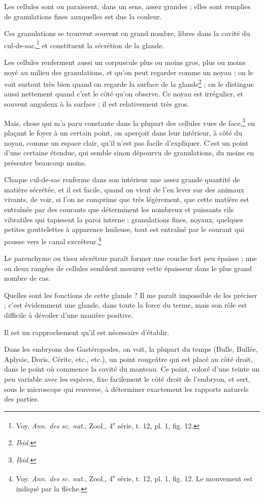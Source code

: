\documentclass[a4paper, 11pt, oneside, polutonikogreek, french]{article}
\begin{document}
Les cellules sont ou paraissent, dans un sens, assez grandes ; elles sont remplies de granulations fines auxquelles est due la couleur.

Ces granulations se trouvent souvent en grand nombre, libres dans la cavité du cul-de-sac,\footnote{Voy. \emph{Ann. des sc. nat.}, Zool., 4\textsuperscript{e} série, t. 12, pl. 1, fig. 12.} et constituent la sécrétion de la glande.

Les cellules renferment aussi un corpuscule plus ou moins gros, plus ou moins noyé au milieu des granulations, et qu'on peut regarder comme un noyau ; on le voit surtout très bien quand on regarde la surface de la glande\footnote{\emph{Ibid.}} ; on le distingue aussi nettement quand c'est le côté qu'on observe. Ce noyau est irrégulier, et souvent anguleux à la surface ; il est relativement très gros.

Mais, chose qui m'a paru constante dans la plupart des cellules vues de face,\footnote{\emph{Ibid.}} en plaçant le foyer à un certain point, on aperçoit dans leur intérieur, à côté du noyau, comme un espace clair, qu'il n'est pas facile d'expliquer. C'est un point d'une certaine étendue, qui semble sinon dépourvu de granulations, du moins en présenter beaucoup moins.

Chaque cul-de-sac renferme dans son intérieur une assez grande quantité de matière sécrétée, et il est facile, quand on vient de l'en lever sur des animaux vivants, de voir, si l'on ne comprime que très légèrement, que cette matière est entraînée par des courants que déterminent les nombreux et puissants cils vibratiles qui tapissent la paroi interne : granulations fines, noyaux, quelques petites gouttelettes à apparence huileuse, tout est entraîné par le courant qui pousse vers le canal excréteur.\footnote{Voy. \emph{Ann. des sc. nat.}, Zool., 4\textsuperscript{e} série, t. 12, pl. 1, fig. 12. Le mouvement est indiqué par la flèche.}

Le parenchyme ou tissu sécréteur paraît former une couche fort peu épaisse ; une ou deux rangées de cellules semblent mesurer cette épaisseur dans le plus grand nombre de cas.

Quelles sont les fonctions de cette glande ? Il me paraît impossible de les préciser ; c'est évidemment une glande, dans toute la force du terme, mais son rôle est difficile à dévoiler d'une manière positive.

Il est un rapprochement qu'il est nécessaire d'établir.

Dans les embryons des Gastéropodes, on voit, la plupart du temps (Bulle, Bullée, Aplysie, Doris, Cérite, etc., etc.), un point rougeâtre qui est placé au côté droit, dans le point où commence la cavité du manteau. Ce point, coloré d'une teinte un peu variable avec les espèces, fixe facilement le côté droit de l'embryon, et sert, sous le microscope qui renverse, à déterminer exactement les rapports naturels des parties.
\end{document}

